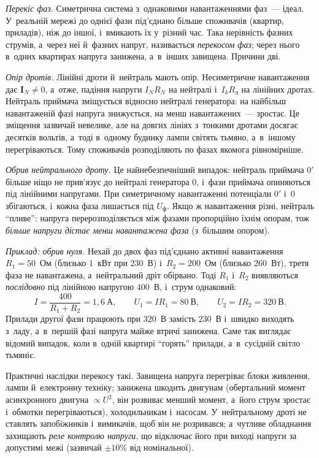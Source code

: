 \begin{Extra}
\emph{Перекіс фаз.} Симетрична система з~однаковими навантаженнями фаз~--- ідеал. У~реальній мережі до однієї фази під'єднано більше споживачів (квартир, приладів), ніж до іншої, і~вмикають їх у~різний час. Така нерівність фазних струмів, а~через неї й~фазних напруг, називається \emph{перекосом фаз}; через нього в~одних квартирах напруга занижена, а~в~інших завищена. Причини дві.

\emph{Опір дротів.} Лінійні дроти й~нейтраль мають опір. Несиметричне навантаження дає $\mathbf I_N \ne 0$, а~отже, падіння напруги $I_N R_N$ на нейтралі і~$I_k R_\text{л}$ на лінійних дротах. Нейтраль приймача зміщується відносно нейтралі генератора: на найбільш навантаженій фазі напруга знижується, на менш навантажених~--- зростає. Це зміщення зазвичай невелике, але на довгих лініях з~тонкими дротами досягає десятків вольтів, а~тоді в~одному будинку лампи світять тьмяно, а~в~іншому перегріваються. Тому споживачів розподіляють по фазах якомога рівномірніше.

\emph{Обрив нейтрального дроту.} Це найнебезпечніший випадок: нейтраль приймача $0'$ більше ніщо не прив'язує до нейтралі генератора $0$, і~фази приймача опиняються під лінійними напругами. При симетричному навантаженні потенціали $0'$ і~$0$ збігаються, і~кожна фаза лишається під $U_\text{ф}$. Якщо ж навантаження різні, нейтраль \enquote{пливе}: напруга перерозподіляється між фазами пропорційно їхнім опорам, тож \emph{більше напруги дістає менш навантажена фаза} (з~більшим опором).

\emph{Приклад: обрив нуля.} Нехай до двох фаз під'єднано активні навантаження $R_1 = 50$~Ом (близько $1$~кВт при $230$~В) і~$R_2 = 200$~Ом (близько $260$~Вт), третя фаза не навантажена, а~нейтральний дріт обірвано. Тоді $R_1$ і~$R_2$ виявляються \emph{послідовно} під лінійною напругою $400$~В, і~струм однаковий:
	\begin{equation*}
		I = \frac{400}{R_1 + R_2} = 1{,}6~\text{А}, \qquad
		U_1 = IR_1 = 80~\text{В}, \qquad U_2 = IR_2 = 320~\text{В}.
	\end{equation*}
	Прилади другої фази працюють при $320$~В замість $230$~В і~швидко виходять з~ладу, а~в~першій фазі напруга майже втричі занижена. Саме так виглядає відомий випадок, коли в~одній квартирі \enquote{горять} прилади, а~в~сусідній світло тьмяніє.

Практичні наслідки перекосу такі. Завищена напруга перегріває блоки живлення, лампи й~електронну техніку; занижена шкодить двигунам (обертальний момент асинхронного двигуна $\propto U^2$, він розвиває менший момент, а~його струм зростає і~обмотки перегріваються), холодильникам і~насосам. У~нейтральному дроті не ставлять запобіжників і~вимикачів, щоб він не розривався; а~чутливе обладнання захищають \emph{реле контролю напруги}, що відключає його при виході напруги за допустимі межі (зазвичай $\pm10\%$ від номінальної).
\end{Extra}


